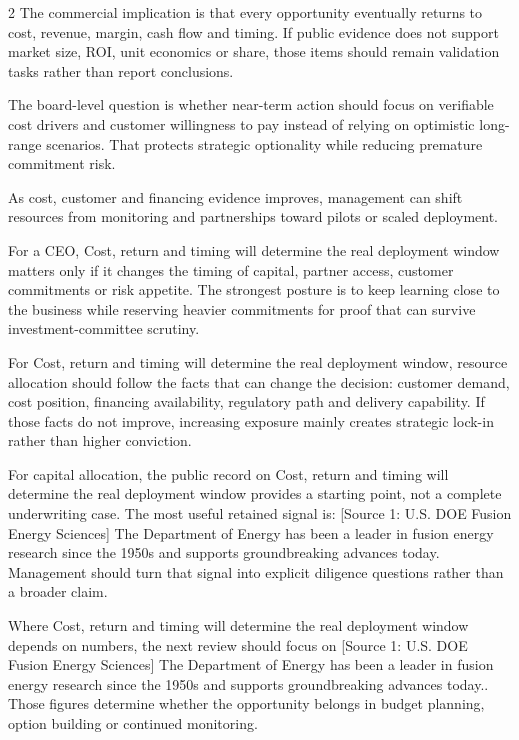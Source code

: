 \documentclass[10pt,a4paper]{article}
\begin{document}
\begin{multicols}{2}
{\small The commercial implication is that every opportunity eventually returns to cost, revenue, margin, cash flow and timing. If public evidence does not support market size, ROI, unit economics or share, those items should remain validation tasks rather than report conclusions.}\par
{\small The board-level question is whether near-term action should focus on verifiable cost drivers and customer willingness to pay instead of relying on optimistic long-range scenarios. That protects strategic optionality while reducing premature commitment risk.}\par
{\small As cost, customer and financing evidence improves, management can shift resources from monitoring and partnerships toward pilots or scaled deployment.}\par
{\small For a CEO, Cost, return and timing will determine the real deployment window matters only if it changes the timing of capital, partner access, customer commitments or risk appetite. The strongest posture is to keep learning close to the business while reserving heavier commitments for proof that can survive investment-committee scrutiny.}\par
{\small For Cost, return and timing will determine the real deployment window, resource allocation should follow the facts that can change the decision: customer demand, cost position, financing availability, regulatory path and delivery capability. If those facts do not improve, increasing exposure mainly creates strategic lock-in rather than higher conviction.}\par
{\small For capital allocation, the public record on Cost, return and timing will determine the real deployment window provides a starting point, not a complete underwriting case. The most useful retained signal is: [Source 1: U.S. DOE Fusion Energy Sciences] The Department of Energy has been a leader in fusion energy research since the 1950s and supports groundbreaking advances today. Management should turn that signal into explicit diligence questions rather than a broader claim.}\par
{\small Where Cost, return and timing will determine the real deployment window depends on numbers, the next review should focus on [Source 1: U.S. DOE Fusion Energy Sciences] The Department of Energy has been a leader in fusion energy research since the 1950s and supports groundbreaking advances today.. Those figures determine whether the opportunity belongs in budget planning, option building or continued monitoring.}\par
\end{multicols}
\label{chap:6:end}
\end{document}
